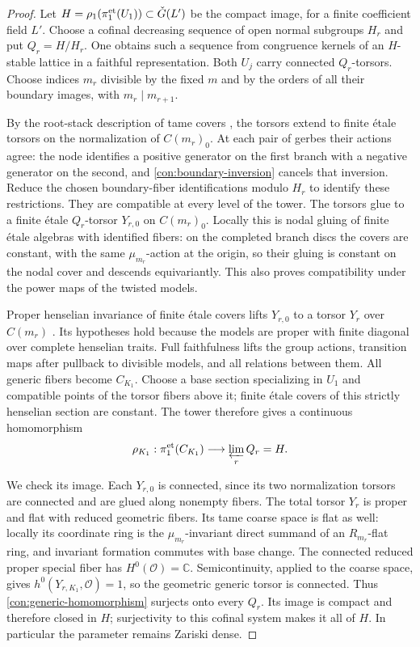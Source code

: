 \begin{proof}
Let $H=\rho_1(\pi_1^{\mathrm{et}}(U_1))\subset\check G(L')$ be the compact
image, for a finite coefficient field $L'$.  Choose a cofinal
decreasing sequence of open normal subgroups $H_r$ and put
$Q_r=H/H_r$.  One obtains such a sequence from congruence kernels
of an $H$-stable lattice in a faithful representation.  Both $U_j$
carry connected $Q_r$-torsors.  Choose indices $m_r$ divisible by
the fixed $m$ and by the orders of all their boundary images, with
$m_r\mid m_{r+1}$.

By the root-stack description of tame covers
\cite[Proposition~A.10]{LieblichOlsson}, the torsors extend to finite
\'etale torsors on the normalization of $C(m_r)_0$.  At each pair
of gerbes their actions agree: the node identifies a positive
generator on the first branch with a negative generator on the
second, and \eqref{con:boundary-inversion} cancels that inversion.
Reduce the chosen boundary-fiber identifications modulo $H_r$ to
identify these restrictions.  They are compatible at every level of
the tower.  The torsors glue to a finite \'etale $Q_r$-torsor
$Y_{r,0}$ on $C(m_r)_0$.  Locally this is nodal gluing of finite
\'etale algebras with identified fibers: on the completed branch
discs the covers are constant, with the same $\mu_{m_r}$-action at
the origin, so their gluing is constant on the nodal cover and
descends equivariantly.  This also proves compatibility under the
power maps of the twisted models.

Proper henselian invariance of finite \'etale covers lifts $Y_{r,0}$
to a torsor $Y_r$ over $C(m_r)$
\cite[Theorem~4.5]{Rydh}.  Its hypotheses hold because the models
are proper with finite diagonal over complete henselian traits.
Full faithfulness lifts the group actions, transition maps after
pullback to divisible models, and all relations between them.
All generic fibers become $C_{K_1}$.  Choose a base section
specializing in $U_1$ and compatible points of the torsor fibers
above it; finite \'etale covers of this strictly henselian section
are constant.  The tower therefore gives a continuous homomorphism
\begin{equation}\label{con:generic-homomorphism}
 \rho_{K_1}:\pi_1^{\mathrm{et}}(C_{K_1})\longrightarrow
                      \varprojlim_r Q_r=H.
\end{equation}

We check its image.  Each $Y_{r,0}$ is connected, since its two
normalization torsors are connected and are glued along nonempty
fibers.  The total torsor $Y_r$ is proper and flat with reduced
geometric fibers.  Its tame coarse space is flat as well: locally
its coordinate ring is the $\mu_{m_r}$-invariant direct summand of an
$R_{m_r}$-flat ring, and invariant formation commutes with base change.
The connected reduced proper special fiber has
$H^0(\mathcal O)=\mathbb C$.  Semicontinuity, applied to the coarse
space, gives $h^0(Y_{r,K_1},\mathcal O)=1$, so the geometric generic
torsor is connected.  Thus \eqref{con:generic-homomorphism} surjects
onto every $Q_r$.  Its image is compact and therefore closed in $H$;
surjectivity to this cofinal system makes it all of $H$.  In
particular the parameter remains Zariski dense.


\end{proof}
